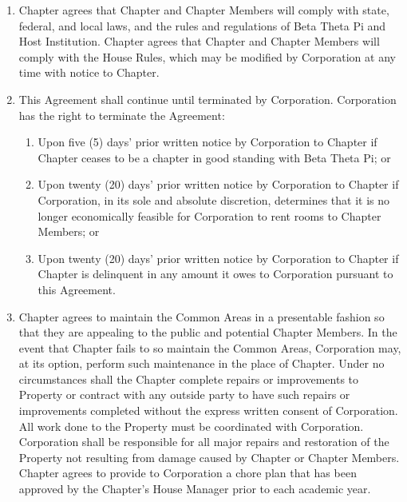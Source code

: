 \documentclass[12pt]{article}
\begin{document}
\begin{enumerate}
        \item Chapter agrees that Chapter and Chapter Members will comply with state, federal, and local laws, and the rules and regulations of Beta Theta Pi and Host Institution.
                Chapter agrees that Chapter and Chapter Members will comply with the House Rules, which may be modified by Corporation at any time with notice to Chapter.

        \item This Agreement shall continue until terminated by Corporation. Corporation has the right to terminate the Agreement:

                \begin{enumerate}[label=\alph*.]
                        \item Upon five (5) days' prior written notice by Corporation to Chapter if Chapter ceases to be a chapter in good standing with Beta Theta Pi; or

                        \item Upon twenty (20) days' prior written notice by Corporation to Chapter if Corporation, in its sole and absolute discretion, determines that it is no longer economically feasible for Corporation to rent rooms to Chapter Members; or

                        \item Upon twenty (20) days' prior written notice by Corporation to Chapter if Chapter is delinquent in any amount it owes to Corporation pursuant to this Agreement.
                \end{enumerate}

        \item Chapter agrees to maintain the Common Areas in a presentable fashion so that they are appealing to the public and potential Chapter Members.
                In the event that Chapter fails to so maintain the Common Areas, Corporation may, at its option, perform such maintenance in the place of Chapter.
                Under no circumstances shall the Chapter complete repairs or improvements to Property or contract with any outside party to have such repairs or improvements completed without the express written consent of Corporation.
                All work done to the Property must be coordinated with Corporation.
                Corporation shall be responsible for all major repairs and restoration of the Property not resulting from damage caused by Chapter or Chapter Members.
                Chapter agrees to provide to Corporation a chore plan that has been approved by the Chapter's House Manager prior to each academic year.


\end{enumerate}
\end{document}
